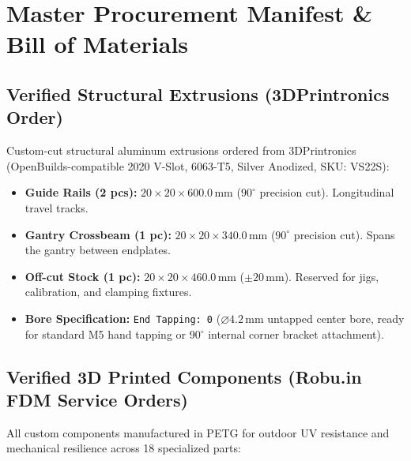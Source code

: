 \documentclass[10pt,a4paper]{article}
\begin{document}
\clearpage

\section{Master Procurement Manifest \& Bill of Materials}

\subsection{Verified Structural Extrusions (3DPrintronics Order)}
Custom-cut structural aluminum extrusions ordered from 3DPrintronics (OpenBuilds-compatible 2020 V-Slot, 6063-T5, Silver Anodized, SKU: VS22S):
\begin{itemize}[leftmargin=*]
    \item \textbf{Guide Rails (2 pcs):} $20 \times 20 \times 600.0\,\text{mm}$ ($90^\circ$ precision cut). Longitudinal travel tracks.
    \item \textbf{Gantry Crossbeam (1 pc):} $20 \times 20 \times 340.0\,\text{mm}$ ($90^\circ$ precision cut). Spans the gantry between endplates.
    \item \textbf{Off-cut Stock (1 pc):} $20 \times 20 \times 460.0\,\text{mm}$ ($\pm 20\,\text{mm}$). Reserved for jigs, calibration, and clamping fixtures.
    \item \textbf{Bore Specification:} \texttt{End Tapping: 0} ($\varnothing 4.2\,\text{mm}$ untapped center bore, ready for standard M5 hand tapping or 90$^\circ$ internal corner bracket attachment).
\end{itemize}

\subsection{Verified 3D Printed Components (Robu.in FDM Service Orders)}
All custom components manufactured in PETG for outdoor UV resistance and mechanical resilience across 18 specialized parts:
\end{document}
